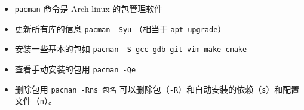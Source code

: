 
\begin{issues}
\issueDraft
\end{issues}

\begin{itemize}
\item \verb`pacman` 命令是 Arch linux 的包管理软件
\item 更新所有库的信息 \verb`pacman -Syu` （相当于 \verb`apt upgrade`）
\item 安装一些基本的包如 \verb`pacman -S gcc gdb git vim make cmake`
\item 查看手动安装的包用 \verb`pacman -Qe`
\item 删除包用 \verb`pacman -Rns 包名` 可以删除包（\verb`-R`）和自动安装的依赖（\verb`s`）和配置文件（\verb`n`）。
\end{itemize}
